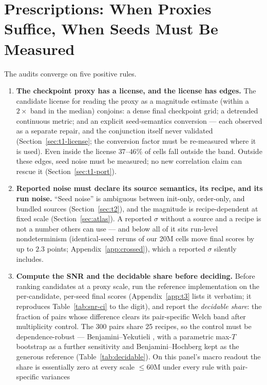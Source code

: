 
\section{Prescriptions: When Proxies Suffice, When Seeds Must Be Measured}
\label{sec:prescriptions}

The audits converge on five positive rules.

\begin{enumerate}[leftmargin=1.6em,itemsep=1pt,topsep=2pt]
\item \textbf{The checkpoint proxy has a license, and the license has edges.}
The candidate license for reading the proxy as a magnitude estimate (within a $2\times$
band in the median) conjoins: a dense final checkpoint grid; a detrended continuous metric;
and an explicit seed-semantics conversion --- each observed as a separate repair, and the
conjunction itself never validated (Section~\ref{sec:t1-license}; the conversion
factor must be re-measured where it is used). Even inside the license
$37$--$46\%$ of cells fall outside the band. Outside
these edges, seed noise must be
measured; no new correlation claim can rescue it (Section~\ref{sec:t1-port}).
\item \textbf{Reported noise must declare its source semantics, its recipe, and its run noise.}
``Seed noise'' is ambiguous between init-only, order-only, and bundled sources
(Section~\ref{sec:t2}), and the
magnitude is recipe-dependent at fixed scale (Section~\ref{sec:atlas}). A reported $\sigma$
without a source and a recipe is not a number others can use --- and below all of it sits
run-level nondeterminism (identical-seed reruns of our 20M cells move final scores by up to
$2.3$ points; Appendix~\ref{app:crossed}), which a reported $\sigma$ silently includes.
\item \textbf{Compute the SNR and the decidable share before deciding.}
Before ranking candidates at
a proxy scale, run the reference implementation on the per-candidate, per-seed final
scores (Appendix~\ref{app:t3} lists it verbatim; it reproduces Table~\ref{tab:snr-ci} to the
digit), and report the \emph{decidable share}: the fraction of pairs whose difference clears
its pair-specific Welch band after multiplicity control. The 300 pairs share 25 recipes, so
the control must be dependence-robust --- Benjamini--Yekutieli \citep{benjamini2001by}, with a
parametric max-$T$ bootstrap as a further sensitivity and Benjamini--Hochberg
\citep{benjamini1995controlling} kept as the
generous reference (Table~\ref{tab:decidable}). On this panel's
macro readout the share is essentially zero at every scale ${\le}60$M under every rule with pair-specific variances

\end{enumerate}
